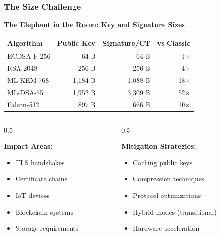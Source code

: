 \documentclass[aspectratio=169,10pt]{beamer}
\newcommand{\slideheader}[1]{\frametitle{#1}}
\theoremstyle{plain}
\begin{document}
\begin{frame}
  \slideheader{The Size Challenge}
  
  \begin{center}
    \textbf{\large The Elephant in the Room: Key and Signature Sizes}
  \end{center}
  
  \vspace{0.5cm}
  
  \begin{table}
    \centering
    \begin{tabular}{|l|r|r|r|}
      \hline
      \textbf{Algorithm} & \textbf{Public Key} & \textbf{Signature/CT} & \textbf{vs Classic} \\
      \hline
      ECDSA P-256 & 64 B & 64 B & 1× \\
      RSA-2048 & 256 B & 256 B & 4× \\
      \hline
      ML-KEM-768 & 1,184 B & 1,088 B & 18× \\
      ML-DSA-65 & 1,952 B & 3,309 B & 52× \\
      Falcon-512 & 897 B & 666 B & 10× \\
      \hline
    \end{tabular}
  \end{table}
  
  \vspace{0.5cm}
  
  \begin{columns}[T]
    \begin{column}{0.5\textwidth}

    \textbf{Impact Areas:}
    \begin{itemize}
      \item TLS handshakes
      \item Certificate chains
      \item IoT devices
      \item Blockchain systems
      \item Storage requirements
    \end{itemize}
  
    \end{column}
    \begin{column}{0.5\textwidth}

    \textbf{Mitigation Strategies:}
    \begin{itemize}
      \item Caching public keys
      \item Compression techniques
      \item Protocol optimizations
      \item Hybrid modes (transitional)
      \item Hardware acceleration
    \end{itemize}
  

\end{column}
\end{columns}
\end{frame}
\end{document}
